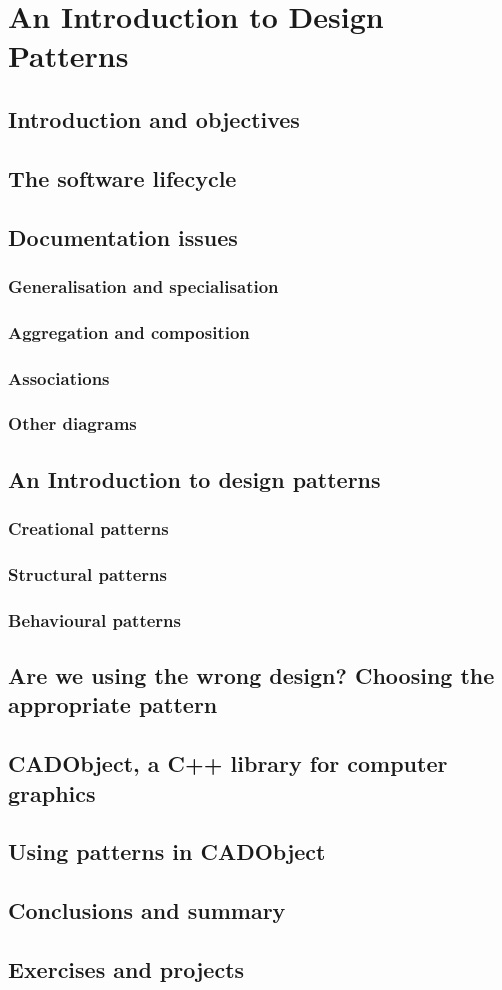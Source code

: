 \chapter{An Introduction to Design Patterns}

\section{Introduction and objectives}
\section{The software lifecycle}
\section{Documentation issues}

\subsection{Generalisation and specialisation}
\subsection{Aggregation and composition}
\subsection{Associations}
\subsection{Other diagrams}

\section{An Introduction to design patterns}

\subsection{Creational patterns}
\subsection{Structural patterns}
\subsection{Behavioural patterns}

\section{Are we using the wrong design? Choosing the appropriate pattern}
\section{CADObject, a C++ library for computer graphics}
\section{Using patterns in CADObject}
\section{Conclusions and summary}
\section{Exercises and projects}